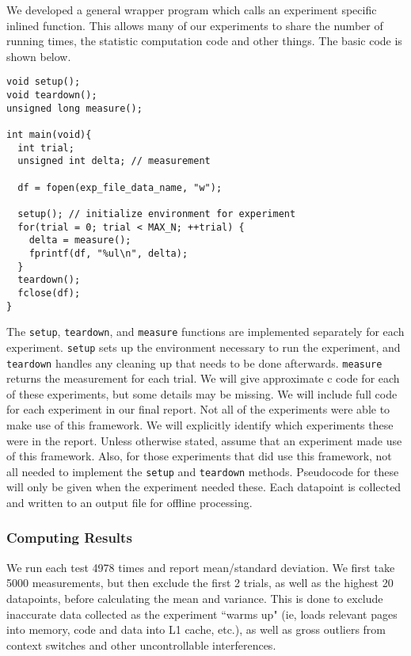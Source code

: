 We developed a general wrapper program which calls an experiment specific inlined function.
This allows many of our experiments to share the number of running times, the statistic computation code and other things.
The basic code is shown below.

\begin{verbatim}
void setup();
void teardown();
unsigned long measure();

int main(void){
  int trial;
  unsigned int delta; // measurement

  df = fopen(exp_file_data_name, "w");

  setup(); // initialize environment for experiment
  for(trial = 0; trial < MAX_N; ++trial) {
    delta = measure();
    fprintf(df, "%ul\n", delta);
  }
  teardown();
  fclose(df);
}
\end{verbatim}

\noindent The {\tt setup}, {\tt teardown}, and {\tt measure} functions are implemented separately for each experiment. {\tt setup} sets up the environment necessary to run the experiment, and {\tt teardown} handles any cleaning up that needs to be done afterwards. {\tt measure} returns the measurement for each trial. We will give approximate c code for each of these experiments, but some details may be missing. We will include full code for each experiment in our final report.
\newline
\newline
Not all of the experiments were able to make use of this framework. We will explicitly identify which experiments these were in the report. Unless otherwise stated, assume that an experiment made use of this framework. Also, for those experiments that did use this framework, not all needed to implement the {\tt setup} and {\tt teardown} methods. Pseudocode for these will only be given when the experiment needed these.
\newline
\newline
Each datapoint is collected and written to an output file for offline processing.

\subsubsection{Computing Results}

\noindent We run each test 4978 times and report mean/standard deviation. We first take 5000 measurements, but then exclude the first 2 trials, as well as the highest 20 datapoints, before calculating the mean and variance. This is done to exclude inaccurate data collected as the experiment ``warms up" (ie, loads relevant pages into memory, code and data into L1 cache, etc.), as well as gross outliers from context switches and other uncontrollable interferences.

